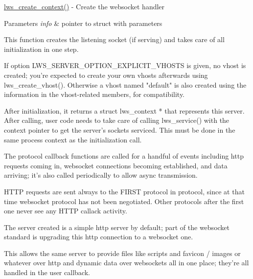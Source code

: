 \hyperlink{group__context-and-vhost_gaf2fff58562caab7510c41eeac85a8648}{lws\+\_\+create\+\_\+context()} -\/ Create the websocket handler 
\begin{DoxyParams}{Parameters}
{\em info} & pointer to struct with parameters \begin{DoxyVerb} This function creates the listening socket (if serving) and takes care
 of all initialization in one step.

 If option LWS_SERVER_OPTION_EXPLICIT_VHOSTS is given, no vhost is
 created; you're expected to create your own vhosts afterwards using
 lws_create_vhost().  Otherwise a vhost named "default" is also created
 using the information in the vhost-related members, for compatibility.

 After initialization, it returns a struct lws_context * that
 represents this server.  After calling, user code needs to take care
 of calling lws_service() with the context pointer to get the
 server's sockets serviced.  This must be done in the same process
 context as the initialization call.

 The protocol callback functions are called for a handful of events
 including http requests coming in, websocket connections becoming
 established, and data arriving; it's also called periodically to allow
 async transmission.

 HTTP requests are sent always to the FIRST protocol in protocol, since
 at that time websocket protocol has not been negotiated.  Other
 protocols after the first one never see any HTTP callack activity.

 The server created is a simple http server by default; part of the
 websocket standard is upgrading this http connection to a websocket one.

 This allows the same server to provide files like scripts and favicon /
 images or whatever over http and dynamic data over websockets all in
 one place; they're all handled in the user callback.\end{DoxyVerb}
 \\
\hline
\end{DoxyParams}
